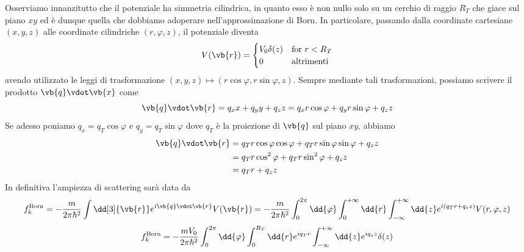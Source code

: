\begin{soluzione}
   Osserviamo innanzitutto che il potenziale ha simmetria cilindrica, in quanto esso è non nullo solo su un cerchio di raggio $R_T$ che giace sul piano $xy$ ed è dunque quella che dobbiamo adoperare nell'approssimazione di Born. In particolare, passando dalla coordinate cartesiane $(x,y,z)$ alle coordinate cilindriche $(r,\varphi,z)$, il potenziale diventa
   \begin{equation*}
      V(\vb{r})=
      \begin{cases}
         V_0 \delta(z) & \text{for } r < R_T\\
         0 & \text{altrimenti}
      \end{cases}
   \end{equation*}
   avendo utilizzato le leggi di trasformazione $(x,y,z) \mapsto (r\cos{\varphi},r\sin{\varphi},z)$. Sempre mediante tali trasformazioni, possiamo scrivere il prodotto $\vb{q} \vdot \vb{x}$ come
   \begin{equation*}
      \vb{q} \vdot \vb{r}
      =q_x x + q_y y + q_z z
      =q_x r \cos{\varphi} + q_y r \sin{\varphi} + q_z z
   \end{equation*}
   Se adesso poniamo $q_x=q_T \cos{\varphi}$ e $q_y=q_T \sin{\varphi}$ dove $q_T$ è la proiezione di $\vb{q}$ sul piano $xy$, abbiamo
   \begin{equation*}
      \begin{split}
         \vb{q} \vdot \vb{r}
         & =q_T r \cos{\varphi} \cos{\varphi} + q_T r \sin{\varphi} \sin{\varphi} + q_z z
         \\
         & =q_T r \cos^2{\varphi} + q_T r \sin^2{\varphi} + q_z z
         \\
         & =q_T r + q_z z
      \end{split}
   \end{equation*}
   In definitiva l'ampiezza di scattering sarà data da
   \begin{equation*}
      f_k^{\rm Born}
      =-\frac{m}{2 \pi \hbar^2} \int \dd[3]{\vb{r}} e^{i \vb{q} \vdot \vb{r}} V(\vb{r})
      =-\frac{m}{2 \pi \hbar^2} \int_{0}^{2\pi} \dd{\varphi} \int_{0}^{+\infty} \dd{r} \int_{-\infty}^{+\infty} \dd{z} e^{i (q_T r + q_z z)} V(r,\varphi,z)
   \end{equation*}
   \begin{equation*}
      f_k^{\rm Born}
      =-\frac{m V_0}{2 \pi \hbar^2} \int_{0}^{2\pi} \dd{\varphi} \int_{0}^{R_T} \dd{r} e^{i q_T r} \int_{-\infty}^{+\infty} \dd{z} e^{i q_z z} \delta(z)

\end{equation*}
\end{soluzione}
